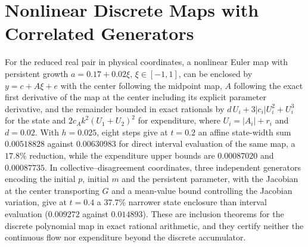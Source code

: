 \documentclass[11pt,notitlepage]{report}
\theoremstyle{definition}
\theoremstyle{remark}
\begin{document}
\section{Nonlinear Discrete Maps with Correlated Generators}
For the reduced real pair in physical coordinates, a nonlinear Euler map with persistent growth $a=0.17+0.02\xi$, $\xi\in[-1,1]$, can be enclosed by $y=c+A\xi+e$ with the center following the midpoint map, $A$ following the exact first derivative of the map at the center including its explicit parameter derivative, and the remainder bounded in exact rationals by $d\,U_i+3|c_i|U_i^2+U_i^3$ for the state and $2c_Ak^2(U_1+U_2)^2$ for expenditure, where $U_i=|A_i|+r_i$ and $d=0.02$. With $h=0.025$, eight steps give at $t=0.2$ an affine state-width sum $0.00518828$ against $0.00630983$ for direct interval evaluation of the same map, a $17.8\%$ reduction, while the expenditure upper bounds are $0.00087020$ and $0.00087735$. In collective--disagreement coordinates, three independent generators encoding the initial $p$, initial $m$ and the persistent parameter, with the Jacobian at the center transporting $G$ and a mean-value bound controlling the Jacobian variation, give at $t=0.4$ a $37.7\%$ narrower state enclosure than interval evaluation ($0.009272$ against $0.014893$). These are inclusion theorems for the discrete polynomial map in exact rational arithmetic, and they certify neither the continuous flow nor expenditure beyond the discrete accumulator.
\end{document}
